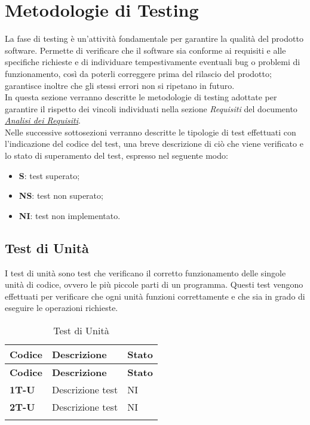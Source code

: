 \section{Metodologie di Testing}
La fase di testing è un'attività fondamentale per garantire la qualità del prodotto software. Permette di verificare che il software sia conforme ai requisiti e alle specifiche richieste e di individuare tempestivamente eventuali bug o problemi di funzionamento, così da poterli correggere prima del rilascio del prodotto; garantisce inoltre che gli stessi errori non si ripetano in futuro. \\
In questa sezione verranno descritte le metodologie di testing adottate per garantire il rispetto dei vincoli individuati nella sezione \textit{Requisiti} del documento \href{https://7last.github.io/docs/rtb/documentazione-esterna/analisi-dei-requisiti}{\textit{Analisi dei Requisiti}}. \\ %
Nelle successive sottosezioni verranno descritte le tipologie di test effettuati con l'indicazione del codice del test, una breve descrizione di ciò che viene verificato e lo stato di superamento del test, espresso nel seguente modo: \\
\begin{itemize}
    \item \textbf{S}: test superato;
    \item \textbf{NS}: test non superato;
    \item \textbf{NI}: test non implementato.
\end{itemize}

\subsection{Test di Unità}
I test di unità sono test che verificano il corretto funzionamento delle singole unità di codice, ovvero le più piccole parti di un programma. Questi test vengono effettuati per verificare che ogni unità funzioni correttamente e che sia in grado di eseguire le operazioni richieste. \\
\begin{longtable}{|>{\raggedright\arraybackslash}m{}|>{\raggedright\arraybackslash}m{}|>{\raggedright\arraybackslash}m{}|}
	\hline
	\textbf{Codice} & \textbf{Descrizione} & \textbf{Stato} \\
	\hline
	\endfirsthead
	\hline
	\textbf{Codice} & \textbf{Descrizione} & \textbf{Stato} \\
	\endhead
	\textbf{1T-U}   & Descrizione test     & NI             \\
	\hline
	\textbf{2T-U}   & Descrizione test     & NI             \\
	\hline
	\caption{Test di Unità} %
	\label{table:12}
\end{longtable}

